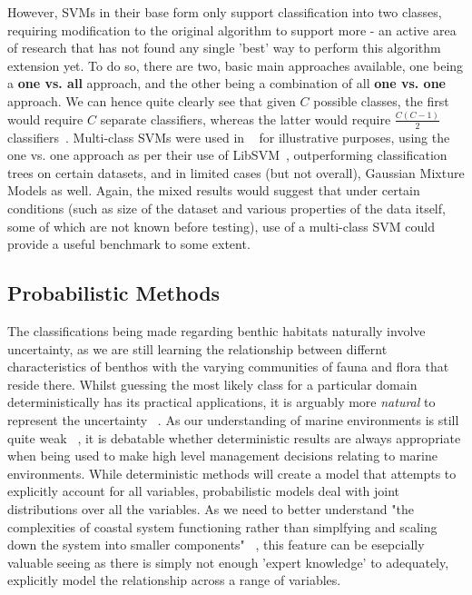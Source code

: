             However, SVMs in their base form only support classification into two classes, requiring modification to the original algorithm to support more - an active area of research that has not found any single 'best' way to perform this algorithm extension yet. To do so, there are two, basic main approaches available, one being a \textbf{one vs. all} approach, and the other being a combination of all \textbf{one vs. one} approach. We can hence quite clearly see that given $C$ possible classes, the first would require $C$ separate classifiers, whereas the latter would require $\frac{C(C-1)}{2}$ classifiers~\citep{murphy12}. Multi-class SVMs were used in ~\citet{ahsan11} for illustrative purposes, using the one vs. one approach as per their use of LibSVM~\citep{chang11}, outperforming classification trees on certain datasets, and in limited cases (but not overall), Gaussian Mixture Models as well. Again, the mixed results would suggest that under certain conditions (such as size of the dataset and various properties of the data itself, some of which are not known before testing), use of a multi-class SVM could provide a useful benchmark to some extent.

            \subsection{Probabilistic Methods}
            The classifications being made regarding benthic habitats naturally involve uncertainty, as we are still learning the relationship between differnt characteristics of benthos with the varying communities of fauna and flora that reside there. Whilst guessing the most likely class for a particular domain deterministically has its practical applications, it is arguably more \textit{natural} to represent the uncertainty ~\citep{rasmussen06}. As our understanding of marine environments is still quite weak ~\citep{un04}, it is debatable whether deterministic results are always appropriate when being used to make high level management decisions relating to marine environments. While deterministic methods will create a model that attempts to explicitly account for all variables, probabilistic models deal with joint distributions over all the variables. As we need to better understand "the complexities of coastal system functioning rather than simplfying and scaling down the system into smaller components" ~\citep{diaz04}, this feature can be esepcially valuable seeing as there is simply not enough 'expert knowledge' to adequately, explicitly model the relationship across a range of variables.

